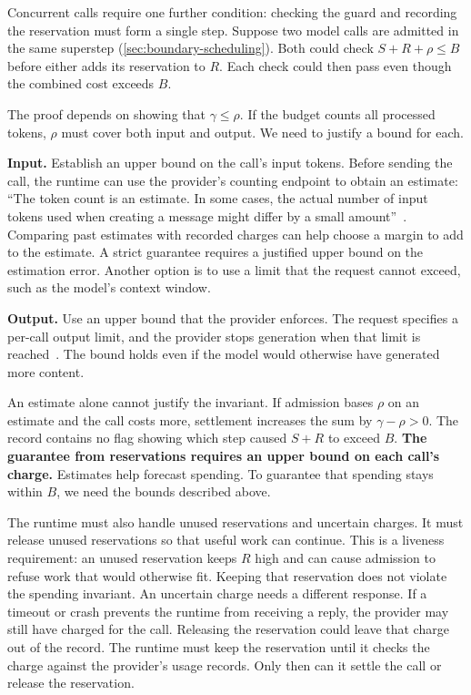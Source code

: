 \ei

Concurrent calls require one further condition: checking the guard and recording the reservation
must form a single step. Suppose two model calls are admitted in the same superstep
(\cref{sec:boundary-scheduling}). Both could check $S + R + \rho \leq B$ before either adds its
reservation to $R$. Each check could then pass even though the combined cost exceeds $B$.

The proof depends on showing that $\gamma \leq \rho$. If the budget counts all processed tokens,
$\rho$ must cover both input and output. We need to justify a bound for each.

\bi

\item \textbf{Input.} Establish an upper bound on the call's input tokens. Before sending the
call, the runtime can use the provider's counting endpoint to obtain an estimate: ``The token
count is an estimate. In some cases, the actual number of input tokens used when creating a message
might differ by a small amount''~\citep{anthropic-token-counting}. Comparing past estimates with
recorded charges can help choose a margin to add to the estimate. A strict guarantee requires a
justified upper bound on the estimation error. Another option is to use a limit that the request
cannot exceed, such as the model's context window.

\item \textbf{Output.} Use an upper bound that the provider enforces. The request specifies a
per-call output limit, and the provider stops generation when that limit is
reached~\citep{anthropic-stop-reasons}. The bound holds even if the model would otherwise have
generated more content.

\ei

An estimate alone cannot justify the invariant. If admission bases $\rho$ on an estimate and the
call costs more, settlement increases the sum by $\gamma - \rho > 0$. The record contains no
flag showing which step caused $S + R$ to exceed $B$. \textbf{The guarantee from reservations
requires an upper bound on each call's charge.} Estimates help forecast spending. To guarantee
that spending stays within $B$, we need the bounds described above.

The runtime must also handle unused reservations and uncertain charges. It must release unused
reservations so that useful work can continue. This is a liveness requirement: an unused
reservation keeps $R$ high and can cause admission to refuse work that would otherwise fit.
Keeping that reservation does not violate the spending invariant. An uncertain charge needs a
different response. If a timeout or crash prevents the runtime from receiving a reply, the
provider may still have charged for the call. Releasing the reservation could leave that charge
out of the record. The runtime must keep the reservation until it checks the charge against the
provider's usage records. Only then can it settle the call or release the reservation.

